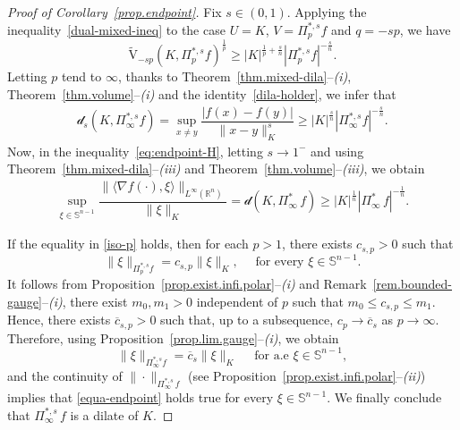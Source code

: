 \documentclass[11pt, reqno]{article}
\theoremstyle{definition}
\numberwithin{equation}{section}
\newcommand{\R}{\mathbb{R}}
\newcommand{\Sphere}{\mathbb{S}^{n - 1}}
\newcommand{\vtil}{\widetilde{\mathrm{V}}}
\newcommand{\dila}{\mathscr{d}}
\begin{document}
\begin{proof}[Proof of Corollary~\ref{prop.endpoint}]
Fix $s \in (0, 1)$.
Applying the inequality~\eqref{dual-mixed-ineq} to the case $U = K$, $V = \Pi^{\ast, s}_p f$ and $q = - sp$, we have
\begin{equation}\label{iso-p}
    \vtil_{-sp}(K, \Pi^{\ast, s}_p f)^{\frac{1}{p}} \geq |K|^{\frac{1}{p} + \frac{s}{n}} |\Pi^{\ast, s}_p  f|^{- \frac{s}{n}}.
\end{equation}
Letting $p$ tend to $\infty$, thanks to Theorem~\ref{thm.mixed-dila}--\textit{(i)}, Theorem~\ref{thm.volume}--\textit{(i)} and the identity~\eqref{dila-holder}, we infer that
\begin{align*}
    \dila_s(K, \Pi^{\ast, s}_\infty  f) = \sup_{x \neq y} \dfrac{|f(x) - f(y)|}{\| x - y \|_K^s} \geq |K|^{\frac{s}{n}}|\Pi^{\ast, s}_\infty  f|^{- \frac{s}{n}}.
\end{align*}
Now, in the inequality~\eqref{eq:endpoint-H}, letting $s \to 1^-$ and using Theorem~\ref{thm.mixed-dila}--\textit{(iii)} and Theorem~\ref{thm.volume}--\textit{(iii)}, we obtain
\begin{align*}
    \sup_{\xi \in \Sphere} \dfrac{\| \langle \nabla f(\cdot), \xi \rangle \|_{L^\infty(\R^n)}}{\| \xi \|_K} = \dila(K, \Pi^{\ast}_\infty \, f) \geq |K|^{\frac{1}{n}} |\Pi^\ast_\infty \, f|^{-\frac{1}{n}}.
\end{align*}

\medskip

If the equality in \eqref{iso-p} holds, then for each $p > 1$, there exists $c_{s, p} > 0$ such that 
\[
	\| \xi \|_{\Pi^{\ast, s}_p f} = c_{s, p} \| \xi \|_K, \quad \text{ for every } \xi \in \Sphere.
\]
It follows from Proposition~\ref{prop.exist.infi.polar}--\textit{(i)} and Remark~\ref{rem.bounded-gauge}--\textit{(i)}, there exist $m_0, m_1 > 0$ independent of $p$ such that $m_0 \leq c_{s, p} \leq m_1$.
Hence, there exists $\overline c_{s, p} > 0$ such that, up to a subsequence, $c_p \to \overline c_s$ as $p \to \infty$. 
Therefore, using Proposition~\ref{prop.lim.gauge}--\textit{(i)}, we obtain
\begin{equation}\label{equa-endpoint}
	\| \xi \|_{\Pi^{\ast, s}_\infty f} = \overline c_s \| \xi \|_K \quad \text{ for a.e } \xi \in \Sphere,
\end{equation}
and the continuity of $\| \cdot \|_{\Pi^{\ast, s}_\infty \, f}$ (see Proposition~\ref{prop.exist.infi.polar}--\textit{(ii)}) implies that \eqref{equa-endpoint} holds true for every $\xi \in \Sphere$.
We finally conclude that $\Pi^{\ast, s}_\infty \, f$ is a dilate of $K$.


\end{proof}
\end{document}
